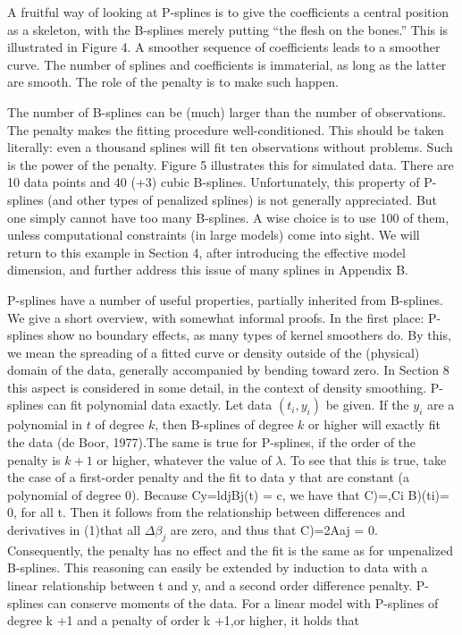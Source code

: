 \documentclass[12pt]{article}
\newcommand*\needsparaphrased{\color{red}}
\begin{document}
{\needsparaphrased A fruitful way of looking at P-splines is to give the coefficients a central position as a skeleton, with the B-splines merely putting ``the flesh on the bones.'' This is illustrated
in Figure 4. A smoother sequence of coefficients leads to a smoother curve. The number of splines and coefficients is immaterial, as long as the latter are smooth. The role of the
penalty is to make such happen. 

The number of B-splines can be (much) larger than the number of observations. The penalty makes the fitting procedure well-conditioned. This should be taken literally: even a thousand splines will fit ten observations without problems. Such is the power of the penalty. Figure 5 illustrates this for simulated data. There are 10 data points and 40 (+3) cubic B-splines. Unfortunately, this property of P-splines (and other types of penalized splines) is not generally appreciated. But one simply cannot have too many B-splines. A wise choice is to use 100 of them, unless computational constraints (in large models) come into sight. We will return to this example in Section 4, after introducing the effective model dimension, and further address this issue of many splines in Appendix B.}

{\needsparaphrased P-splines have a number of useful properties, partially inherited from B-splines. We give a short overview, with somewhat informal proofs. In the first place: P-splines show no boundary effects, as many types of kernel smoothers do. By this, we mean the spreading of a fitted curve or density outside of the (physical) domain of the data, generally accompanied by bending toward zero. In Section 8 this aspect is considered in some detail, in the context of density smoothing. P-splines can fit polynomial data exactly. Let data $\left(t_i,y_i\right)$ be given. If the $y_i$ are a polynomial in $t$ of degree $k$, then B-splines of degree $k$ or higher will exactly fit the data (de Boor, 1977).The same is true for P-splines, if the order of the penalty is $k +1$ or higher, whatever the value of $\lambda$. To see that this is true, take the case of a first-order penalty and the fit to data y that are constant (a polynomial of degree 0). Because Cy=ldjBj(t) = c, we have that C)=,Ci B)(ti)= 0, for all t. Then it follows from the relationship between differences and derivatives in (1)that all $\Delta \beta_j$ are zero, and thus that C)=2Aaj = 0. Consequently, the penalty has no effect and the fit is the same as for unpenalized B-splines. This reasoning can easily be extended by induction to data with a linear relationship between t and y, and a second order difference penalty.
P-splines can conserve moments of the data. For a linear model with P-splines of degree k +1 and a penalty of order k +1,or higher, it holds that }
\end{document}
